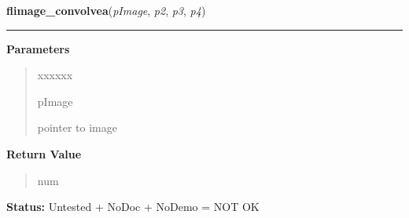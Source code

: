 \hspace{.8\funcindent}\begin{boxedminipage}{\funcwidth}

    \raggedright \textbf{flimage\_convolvea}(\textit{pImage}, \textit{p2}, \textit{p3}, \textit{p4})

    \vspace{-1.5ex}

    \rule{\textwidth}{0.5\fboxrule}
\setlength{\parskip}{2ex}
\setlength{\parskip}{1ex}
      \textbf{Parameters}
      \vspace{-1ex}

      \begin{quote}
        \begin{Ventry}{xxxxxx}

          \item[pImage]

          pointer to image

        \end{Ventry}

      \end{quote}

      \textbf{Return Value}
    \vspace{-1ex}

      \begin{quote}
      num

      \end{quote}

\textbf{Status:} Untested + NoDoc + NoDemo = NOT OK



    \end{boxedminipage}

    \label{xformslib:library:flimage_tint}

    \vspace{0.5ex}

